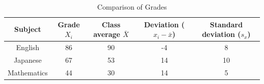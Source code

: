 \begin{table}[ht]
	\centering
	\caption{Comparison of Grades}
	\begin{tabular}{ccccc}
		Subject     & Grade $X_i$ & Class average $\bar{X}$ & Deviation ($x_i - \bar{x}$) & Standard deviation ($s_x$) \\\hline
		English     & 86          & 90                      & -4                          & 8                          \\
		Japanese    & 67          & 53                      & 14                          & 10                         \\
		Mathematics & 44          & 30                      & 14                          & 5                          \\
	\end{tabular}
	\label{tbl::04_03}
\end{table}
